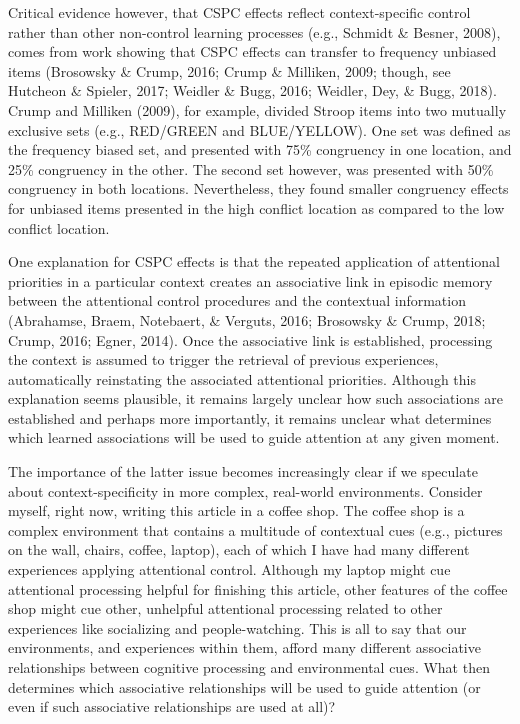 \documentclass[english,,man,floatsintext]{apa6}
\begin{document}
Critical evidence however, that CSPC effects reflect context-specific
control rather than other non-control learning processes (e.g., Schmidt
\& Besner, 2008), comes from work showing that CSPC effects can transfer
to frequency unbiased items (Brosowsky \& Crump, 2016; Crump \&
Milliken, 2009; though, see Hutcheon \& Spieler, 2017; Weidler \& Bugg,
2016; Weidler, Dey, \& Bugg, 2018). Crump and Milliken (2009), for
example, divided Stroop items into two mutually exclusive sets (e.g.,
RED/GREEN and BLUE/YELLOW). One set was defined as the frequency biased
set, and presented with 75\% congruency in one location, and 25\%
congruency in the other. The second set however, was presented with 50\%
congruency in both locations. Nevertheless, they found smaller
congruency effects for unbiased items presented in the high conflict
location as compared to the low conflict location.

One explanation for CSPC effects is that the repeated application of
attentional priorities in a particular context creates an associative
link in episodic memory between the attentional control procedures and
the contextual information (Abrahamse, Braem, Notebaert, \& Verguts,
2016; Brosowsky \& Crump, 2018; Crump, 2016; Egner, 2014). Once the
associative link is established, processing the context is assumed to
trigger the retrieval of previous experiences, automatically reinstating
the associated attentional priorities. Although this explanation seems
plausible, it remains largely unclear how such associations are
established and perhaps more importantly, it remains unclear what
determines which learned associations will be used to guide attention at
any given moment.

The importance of the latter issue becomes increasingly clear if we
speculate about context-specificity in more complex, real-world
environments. Consider myself, right now, writing this article in a
coffee shop. The coffee shop is a complex environment that contains a
multitude of contextual cues (e.g., pictures on the wall, chairs,
coffee, laptop), each of which I have had many different experiences
applying attentional control. Although my laptop might cue attentional
processing helpful for finishing this article, other features of the
coffee shop might cue other, unhelpful attentional processing related to
other experiences like socializing and people-watching. This is all to
say that our environments, and experiences within them, afford many
different associative relationships between cognitive processing and
environmental cues. What then determines which associative relationships
will be used to guide attention (or even if such associative
relationships are used at all)?
\end{document}
